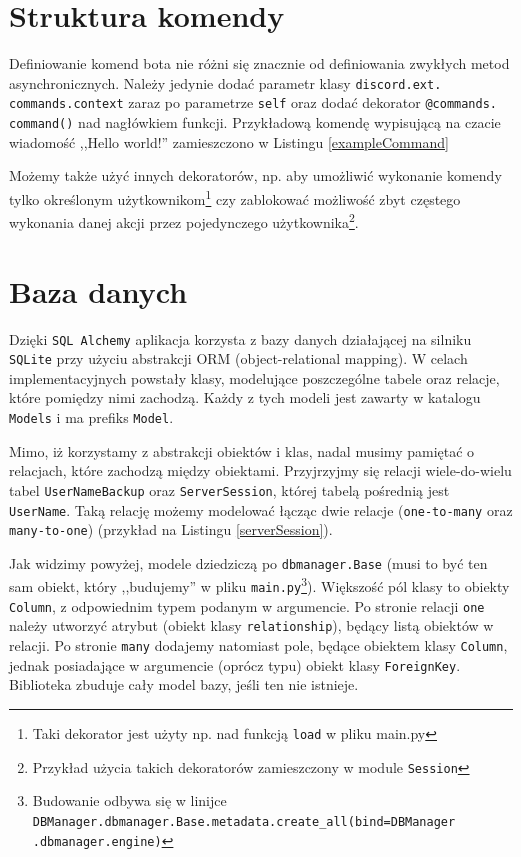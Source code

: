\documentclass[shortabstract,inz]{iithesis}
\begin{document}
		\section{Struktura komendy}
		Definiowanie komend bota nie różni się znacznie od definiowania zwykłych metod asynchronicznych. Należy jedynie dodać parametr klasy \texttt{discord.ext.
			commands.context} zaraz po parametrze \texttt{self} oraz dodać dekorator \texttt{@commands.
			command()} nad nagłówkiem funkcji. Przykładową komendę wypisującą na czacie wiadomość ,,Hello world!'' zamieszczono w Listingu \ref{exampleCommand}
		
		
		
		Możemy także użyć innych dekoratorów, np. aby umożliwić wykonanie komendy tylko określonym użytkownikom\footnote{Taki dekorator jest użyty np. nad funkcją \texttt{load} w pliku main.py} czy zablokować możliwość zbyt częstego wykonania danej akcji przez pojedynczego użytkownika\footnote{Przykład użycia takich dekoratorów zamieszczony w module \texttt{Session}}.
		
		\section{Baza danych}
		Dzięki \texttt{SQL Alchemy} aplikacja korzysta z bazy danych działającej na silniku \texttt{SQLite} przy użyciu abstrakcji ORM (object-relational mapping). W celach implementacyjnych powstały klasy, modelujące poszczególne tabele oraz relacje, które pomiędzy nimi zachodzą. Każdy z tych modeli jest zawarty w katalogu \texttt{Models} i ma prefiks \texttt{Model}.
		
		Mimo, iż korzystamy z abstrakcji obiektów i klas, nadal musimy pamiętać o relacjach, które zachodzą między obiektami. Przyjrzyjmy się relacji wiele-do-wielu tabel \texttt{UserNameBackup} oraz \texttt{ServerSession}, której tabelą pośrednią jest \texttt{UserName}. Taką relację możemy modelować łącząc dwie relacje (\texttt{one-to-many} oraz \texttt{many-to-one}) (przykład na Listingu \ref{serverSession}).
		
		
		
		Jak widzimy powyżej, modele dziedziczą po \texttt{dbmanager.Base} (musi to być ten sam obiekt, który ,,budujemy'' w pliku \texttt{main.py}\footnote{Budowanie odbywa się w linijce \texttt{DBManager.dbmanager.Base.metadata.create\_all(bind=DBManager
				.dbmanager.engine)}}). Większość pól klasy to obiekty \texttt{Column}, z odpowiednim typem podanym w argumencie. Po stronie relacji \texttt{one} należy utworzyć atrybut (obiekt klasy \texttt{relationship}), będący listą obiektów w relacji. Po stronie \texttt{many} dodajemy natomiast pole, będące obiektem klasy \texttt{Column}, jednak posiadające w argumencie (oprócz typu) obiekt klasy \texttt{ForeignKey}. Biblioteka zbuduje cały model bazy, jeśli ten nie istnieje.
		
\end{document}
